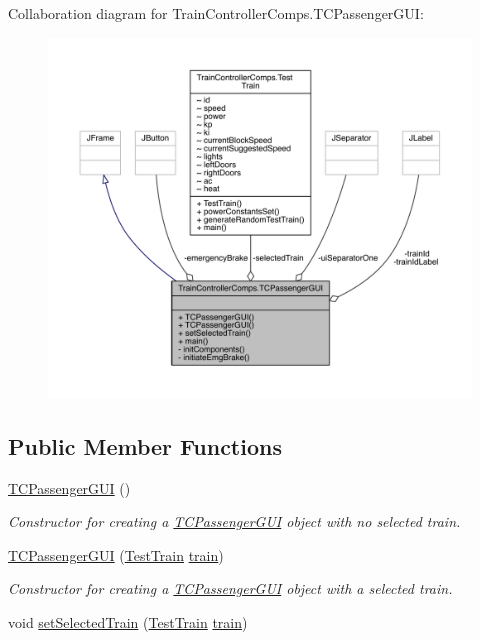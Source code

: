 Collaboration diagram for Train\+Controller\+Comps.\+T\+C\+Passenger\+G\+UI\+:
\nopagebreak
\begin{figure}[H]
\begin{center}
\leavevmode
\includegraphics[width=350pt]{classTrainControllerComps_1_1TCPassengerGUI__coll__graph}
\end{center}
\end{figure}
\subsection*{Public Member Functions}
\begin{DoxyCompactItemize}
\item 
\hyperlink{classTrainControllerComps_1_1TCPassengerGUI_a87ff0e93bee02d188abdd03e33517244}{T\+C\+Passenger\+G\+UI} ()
\begin{DoxyCompactList}\small\item\em Constructor for creating a \hyperlink{classTrainControllerComps_1_1TCPassengerGUI}{T\+C\+Passenger\+G\+UI} object with no selected train. \end{DoxyCompactList}\item 
\hyperlink{classTrainControllerComps_1_1TCPassengerGUI_a1a4a77c620d2c30d15de7d18068893f1}{T\+C\+Passenger\+G\+UI} (\hyperlink{classTrainControllerComps_1_1TestTrain}{Test\+Train} \hyperlink{classtrain}{train})
\begin{DoxyCompactList}\small\item\em Constructor for creating a \hyperlink{classTrainControllerComps_1_1TCPassengerGUI}{T\+C\+Passenger\+G\+UI} object with a selected train. \end{DoxyCompactList}\item 
void \hyperlink{classTrainControllerComps_1_1TCPassengerGUI_ac6b3f1baa4e1d4856020854281786cf8}{set\+Selected\+Train} (\hyperlink{classTrainControllerComps_1_1TestTrain}{Test\+Train} \hyperlink{classtrain}{train})
\end{DoxyCompactItemize}
